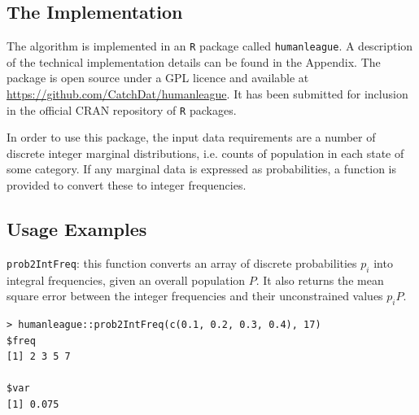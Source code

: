 \documentclass{JASSS}
\newenvironment{Shaded}{\begin{snugshade}}{\end{snugshade}}
\begin{document}
\subsection{The Implementation}\label{the-implementation}

The algorithm is implemented in an \texttt{R} package called
\texttt{humanleague}. A description of the technical implementation details can be found in the Appendix. The package is open source under a GPL licence and available at \url{https://github.com/CatchDat/humanleague}. It has been submitted for inclusion in the official CRAN repository of \texttt{R} packages.

In order to use this package, the input data requirements are a number of discrete integer marginal distributions, i.e. counts of population in each state of some category. If any marginal data is expressed as probabilities, a function is provided to convert these to integer frequencies.

\subsection{Usage Examples}\label{usage-examples}

\texttt{prob2IntFreq}: this function converts an array of discrete probabilities \(p_i\) into integral frequencies, given an overall population \(P\). It also returns the mean square error between the integer frequencies and their unconstrained values \(p_iP\).

\begin{Shaded}
\begin{verbatim}
> humanleague::prob2IntFreq(c(0.1, 0.2, 0.3, 0.4), 17)
$freq
[1] 2 3 5 7

$var
[1] 0.075
\end{verbatim}
\end{Shaded}
\end{document}
